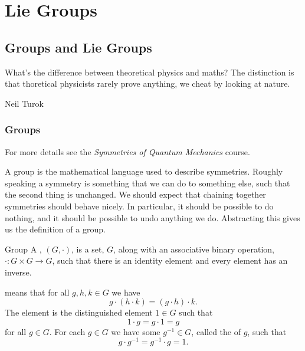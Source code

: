 \documentclass[fleqn]{NotesClass}
\newcommand{\course}[1]{\textit{#1}}
\begin{document}
    \part{Lie Groups}
    \chapter{Groups and Lie Groups}
    \epigraph{What's the difference between theoretical physics and maths? The distinction is that thoretical physicists rarely prove anything, we cheat by looking at nature.}{Neil Turok}
    \section{Groups}
    \begin{rmk}
        For more details see the \course{Symmetries of Quantum Mechanics} course.
    \end{rmk}
    A group is the mathematical language used to describe symmetries.
    Roughly speaking a symmetry is something that we can do to something else, such that the second thing is unchanged.
    We should expect that chaining together symmetries should behave nicely.
    In particular, it should be possible to do nothing, and it should be possible to undo anything we do.
    Abstracting this gives us the definition of a group.
    \begin{dfn}{Group}{}
        A , \((G, \cdot)\), is a set, \(G\), along with an associative binary operation, \(\cdot \colon G\times G \to G\), such that there is an identity element and every element has an inverse.
        
         means that for all \(g, h, k \in G\) we have
        \begin{equation}
            g \cdot (h \cdot k) = (g \cdot h) \cdot k.
        \end{equation}
        The  element is the distinguished element \(1 \in G\) such that
        \begin{equation}
            1 \cdot g = g \cdot 1 = g
        \end{equation}
        for all \(g \in G\).
        For each \(g \in G\) we have some \(g^{-1} \in G\), called the  of \(g\), such that
        \begin{equation}
            g \cdot g^{-1} = g^{-1} \cdot g = 1.
        \end{equation}
    \end{dfn}
    
\end{document}
